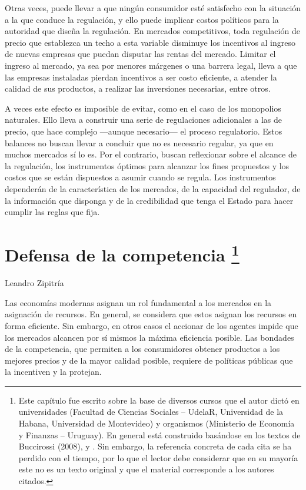 \documentclass[
  12pt,
  spanish,
]{book}
\begin{document}
Otras veces, puede llevar a que ningún consumidor esté satisfecho con la situación a la que conduce la regulación, y ello puede implicar costos políticos para la autoridad que diseña la regulación. En mercados competitivos, toda regulación de precio que establezca un techo a esta variable disminuye los incentivos al ingreso de nuevas empresas que puedan disputar las rentas del mercado. Limitar el ingreso al mercado, ya sea por menores márgenes o una barrera legal, lleva a que las empresas instaladas pierdan incentivos a ser costo eficiente, a atender la calidad de sus productos, a realizar las inversiones necesarias, entre otros.

A veces este efecto es imposible de evitar, como en el caso de los monopolios naturales. Ello lleva a construir una serie de regulaciones adicionales a las de precio, que hace complejo ---aunque necesario--- el proceso regulatorio. Estos balances no buscan llevar a concluir que no es necesario regular, ya que en muchos mercados sí lo es. Por el contrario, buscan reflexionar sobre el alcance de la regulación, los instrumentos óptimos para alcanzar los fines propuestos y los costos que se están dispuestos a asumir cuando se regula. Los instrumentos dependerán de la característica de los mercados, de la capacidad del regulador, de la información que disponga y de la credibilidad que tenga el Estado para hacer cumplir las reglas que fija.

\hypertarget{def-comp}{%
\chapter[Defensa de la competencia ]{\texorpdfstring{Defensa de la competencia \footnote{Este capítulo fue escrito sobre la base de diversos cursos que el autor dictó en universidades (Facultad de Ciencias Sociales -- UdelaR, Universidad de la Habana, Universidad de Montevideo) y organismos (Ministerio de Economía y Finanzas -- Uruguay). En general está construido basándose en los textos de Buccirossi (2008), \citet{Motta2004} y \citet{Viscusi2005}. Sin embargo, la referencia concreta de cada cita se ha perdido con el tiempo, por lo que el lector debe considerar que en su mayoría este no es un texto original y que el material corresponde a los autores citados.}}{Defensa de la competencia }}\label{def-comp}}

Leandro Zipitría

Las economías modernas asignan un rol fundamental a los mercados en la asignación de recursos. En general, se considera que estos asignan los recursos en forma eficiente. Sin embargo, en otros casos el accionar de los agentes impide que los mercados alcancen por sí mismos la máxima eficiencia posible. Las bondades de la competencia, que permiten a los consumidores obtener productos a los mejores precios y de la mayor calidad posible, requiere de políticas públicas que la incentiven y la protejan.
\end{document}
